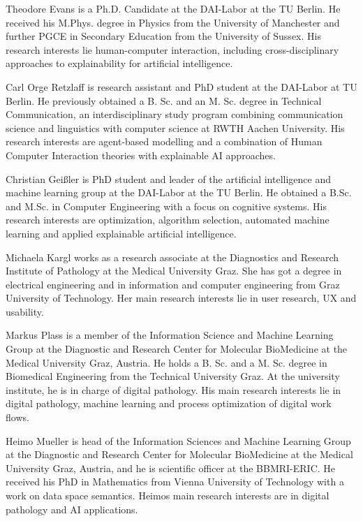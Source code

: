 

Theodore Evans is a Ph.D. Candidate at the DAI-Labor at the TU Berlin. He received his M.Phys. degree in Physics from the University of Manchester and further PGCE in Secondary Education from the University of Sussex. His research interests lie human-computer interaction, including cross-disciplinary approaches to explainability for artificial intelligence.

Carl Orge Retzlaff is research assistant and PhD student at the DAI-Labor at TU Berlin. He previously obtained a B. Sc. and an M. Sc. degree in Technical Communication, an interdisciplinary study program combining communication science and linguistics with computer science at RWTH Aachen University. His research interests are agent-based modelling and a combination of Human Computer Interaction theories with explainable AI approaches.

Christian Geißler is PhD student and leader of the artificial intelligence and machine learning group at the DAI-Labor at the TU Berlin. He obtained a B.Sc. and M.Sc. in Computer Engineering with a focus on cognitive systems. His research interests are optimization, algorithm selection, automated machine learning and applied explainable artificial intelligence.

Michaela Kargl works as a research associate at the Diagnostics and Research Institute of Pathology at the Medical University Graz. She has got a degree in electrical engineering and in  information and computer engineering from Graz University of Technology. Her main research interests lie in user research, UX and usability.

Markus Plass is a member of the Information Science and Machine Learning Group at the Diagnostic and Research Center for Molecular BioMedicine at the Medical University Graz, Austria. He holds a B. Sc. and  a M. Sc. degree in Biomedical Engineering from the Technical University Graz. At the university institute, he is in charge of digital pathology. His main research interests lie in digital pathology, machine learning and process optimization of digital work flows.

Heimo Mueller is head of the Information Sciences and Machine Learning Group at the Diagnostic and Research Center for Molecular BioMedicine at the Medical University Graz, Austria, and he is scientific officer at the BBMRI-ERIC. He received his PhD in Mathematics from Vienna University of Technology with a work on data space semantics. Heimos main research interests are in digital pathology and AI applications. 

